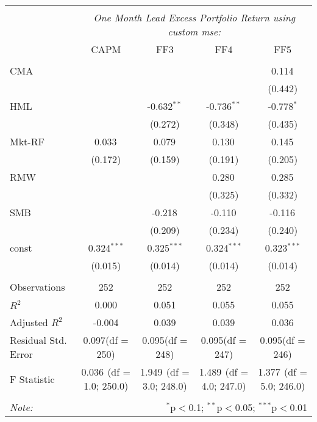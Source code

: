 \begin{table}[!htbp] \centering
\begin{tabular}{@{\extracolsep{5pt}}lcccc}
\\[-1.8ex]\hline
\hline \\[-1.8ex]
& \multicolumn{4}{c}{\textit{One Month Lead Excess Portfolio Return using custom mse:}} \
\cr \cline{4-5}
\\[-1.8ex] & CAPM & FF3 & FF4 & FF5 \\
\hline \\[-1.8ex]
 CMA & & & & 0.114$^{}$ \\
  & & & & (0.442) \\
 HML & & -0.632$^{**}$ & -0.736$^{**}$ & -0.778$^{*}$ \\
  & & (0.272) & (0.348) & (0.435) \\
 Mkt-RF & 0.033$^{}$ & 0.079$^{}$ & 0.130$^{}$ & 0.145$^{}$ \\
  & (0.172) & (0.159) & (0.191) & (0.205) \\
 RMW & & & 0.280$^{}$ & 0.285$^{}$ \\
  & & & (0.325) & (0.332) \\
 SMB & & -0.218$^{}$ & -0.110$^{}$ & -0.116$^{}$ \\
  & & (0.209) & (0.234) & (0.240) \\
 const & 0.324$^{***}$ & 0.325$^{***}$ & 0.324$^{***}$ & 0.323$^{***}$ \\
  & (0.015) & (0.014) & (0.014) & (0.014) \\
\hline \\[-1.8ex]
 Observations & 252 & 252 & 252 & 252 \\
 $R^2$ & 0.000 & 0.051 & 0.055 & 0.055 \\
 Adjusted $R^2$ & -0.004 & 0.039 & 0.039 & 0.036 \\
 Residual Std. Error & 0.097(df = 250) & 0.095(df = 248) & 0.095(df = 247) & 0.095(df = 246)  \\
 F Statistic & 0.036$^{}$ (df = 1.0; 250.0) & 1.949$^{}$ (df = 3.0; 248.0) & 1.489$^{}$ (df = 4.0; 247.0) & 1.377$^{}$ (df = 5.0; 246.0) \\
\hline
\hline \\[-1.8ex]
\textit{Note:} & \multicolumn{4}{r}{$^{*}$p$<$0.1; $^{**}$p$<$0.05; $^{***}$p$<$0.01} \\
\end{tabular}
\end{table}
